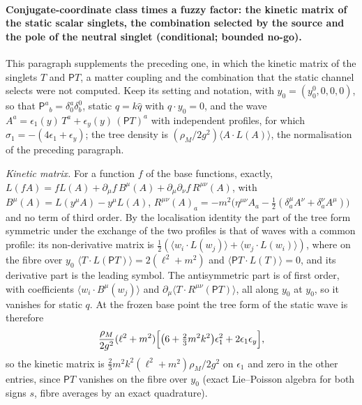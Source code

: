 \paragraph{Conjugate-coordinate class times a fuzzy factor: the kinetic matrix of the static scalar singlets, the combination selected by the source and the pole of the neutral singlet (conditional; bounded no-go).}
This paragraph supplements the preceding one, in which the kinetic matrix of the singlets \(T\) and \(\mathsf PT\), a matter coupling and the combination that the static channel selects were not computed. Keep its setting and notation, with \(y_0=(y_0^0,0,0,0)\), so that \(\mathsf P^a{}_b=\delta^a_0\delta^0_b\), static \(q=k\hat q\) with \(q\cdot y_0=0\), and the wave \(A^a=\epsilon_1(y)\,T^a+\epsilon_y(y)\,(\mathsf PT)^a\) with independent profiles, for which \(\sigma_1=-(4\epsilon_1+\epsilon_y)\); the tree density is \((\rho_M/2g^2)\langle A\cdot L(A)\rangle\), the normalisation of the preceding paragraph.

\emph{Kinetic matrix.} For a function \(f\) of the base functions, exactly, \(L(fA)=fL(A)+\partial_\mu f\,B^\mu(A)+\partial_\mu\partial_\nu f\,R^{\mu\nu}(A)\), with \(B^\mu(A)=L(y^\mu A)-y^\mu L(A)\), \(R^{\mu\nu}(A)_a=-m^2\bigl(\eta^{\mu\nu}A_a-\tfrac12(\delta^\mu_aA^\nu+\delta^\nu_aA^\mu)\bigr)\) and no term of third order. By the localisation identity the part of the tree form symmetric under the exchange of the two profiles is that of waves with a common profile: its non-derivative matrix is \(\tfrac12(\langle w_i\cdot L(w_j)\rangle+\langle w_j\cdot L(w_i)\rangle)\), where on the fibre over \(y_0\) \(\langle T\cdot L(\mathsf PT)\rangle=2(\ell^2+m^2)\) and \(\langle\mathsf PT\cdot L(T)\rangle=0\), and its derivative part is the leading symbol. The antisymmetric part is of first order, with coefficients \(\langle w_i\cdot B^\mu(w_j)\rangle\) and \(\partial_\mu\langle T\cdot R^{\mu\nu}(\mathsf PT)\rangle\), all along \(y_0\) at \(y_0\), so it vanishes for static \(q\). At the frozen base point the tree form of the static wave is therefore
\[
\frac{\rho_M}{2g^2}(\ell^2+m^2)\Bigl[\bigl(6+\tfrac23m^2k^2\bigr)\epsilon_1^2+2\epsilon_1\epsilon_y\Bigr],
\]
so the kinetic matrix is \(\tfrac23m^2k^2(\ell^2+m^2)\rho_M/2g^2\) on \(\epsilon_1\) and zero in the other entries, since \(\mathsf PT\) vanishes on the fibre over \(y_0\) (exact Lie--Poisson algebra for both signs \(s\), fibre averages by an exact quadrature).

